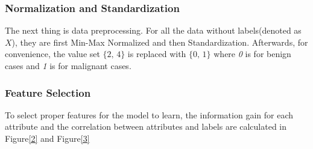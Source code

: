 \documentclass[a4paper]{article}
\begin{document}
\subsubsection*{Normalization and Standardization}
The next thing is data preprocessing. For all the data without labels(denoted as $X$), they are first Min-Max Normalized and then Standardization. Afterwards, for convenience, the value set $\{\textit{2, 4}\}$ is replaced with $\{\textit{0, 1}\}$ where \textit{0} is for benign cases and \textit{1} is for malignant cases. 

\subsubsection*{Feature Selection}
To select proper features for the model to learn, the information gain for each attribute and the correlation between attributes and labels are calculated in Figure\ref{2} and Figure\ref{3}
\end{document}
